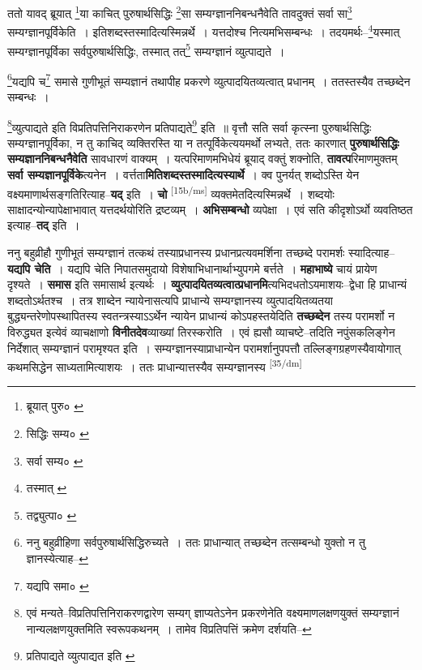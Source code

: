 \documentclass[article,12pt,a4paper]{memoir}
\begin{document}
	ततो यावद् ब्रूयात् \footnote{ब्रूयात् पुरु० \cite{dp-msB} \cite{dp-msC} \cite{dp-edP} \cite{dp-edH} \cite{dp-edE}}या काचित् पुरुषार्थसिद्धिः \footnote{सिद्धिः सम्य० \cite{dp-msA} \cite{dp-msC} \cite{dp-edP} \cite{dp-edH} \cite{dp-edE}}सा सम्यग्ज्ञाननिबन्धनैवेति तावदुक्तं सर्वा सा\footnote{सर्वा सम्य० \cite{dp-msD}} सम्यग्ज्ञानपूर्विकेति । इतिशब्दस्तस्मादित्यस्मिन्नर्थे । यत्तदोश्च नित्यमभिसम्बन्धः । तदयमर्थः--\footnote{तस्मात् \cite{dp-edP}}यस्मात् सम्यग्ज्ञानपूर्विका सर्वपुरुषार्थसिद्धिः, तस्मात् तत्\footnote{तद्व्युत्पा० \cite{dp-msA} \cite{dp-edP} \cite{dp-edH} \cite{dp-edE}} सम्यग्ज्ञानं व्युत्पाद्यते । 
	  
	\footnote{ननु बहुव्रीहिणा सर्वपुरुषार्थसिद्धिरुच्यते । ततः प्राधान्यात् तच्छब्देन तत्सम्बन्धो युक्तो न तु ज्ञानस्येत्याह--\cite{dp-msD-n}}यद्यपि च\footnote{यद्यपि समा० \cite{dp-msC}} समासे गुणीभूतं सम्यज्ञानं तथापीह प्रकरणे व्युत्पादयितव्यत्वात् प्रधानम् । ततस्तस्यैव तच्छब्देन सम्बन्धः । 
	  
	\footnote{एवं मन्यते--विप्रतिपत्तिनिराकरणद्वारेण सम्यग् ज्ञाप्यतेऽनेन प्रकरणेनेति वक्ष्यमाणलक्षणयुक्तं सम्यग्ज्ञानं नान्यलक्षणयुक्तमिति स्वरूपकथनम् । तामेव विप्रतिपत्तिं क्रमेण दर्शयति--\cite{dp-msD-n}}व्युत्पाद्यते इति विप्रतिपत्तिनिराकरणेन प्रतिपाद्यते\footnote{प्रतिपाद्यते व्युत्पाद्यत इति \cite{dp-edE} \cite{dp-edP}} इति ॥ वृत्तौ सति सर्वा कृत्स्ना पुरुषार्थसिद्धिः सम्यग्ज्ञानपूर्विका, न तु काचिद् व्यक्तिरस्ति या न तत्पूर्विकेत्ययमर्थो लभ्यते, ततः कारणात् \textbf{पुरुषार्थसिद्धिः सम्यज्ञाननिबन्धनैवेति} सावधारणं वाक्यम् । यत्परिमाणमभिधेयं ब्रूयाद् वक्तुं शक्नोति, \textbf{तावत्प}रिमाणमुक्तम् \textbf{सर्वा सम्यज्ञानपूर्विके}त्यनेन । वर्त्तता\textbf{मितिशब्दस्तस्मादित्यस्यार्थे} । क्व पुनर्यत् शब्दोऽस्ति येन वक्ष्यमाणार्थसङ्गतिरित्याह--\textbf{यद्} इति । \textbf{चो} \leavevmode\textsuperscript{\rmlatinfont\tiny [15b/ms]} व्यक्तमेतदित्यस्मिन्नर्थे । शब्दयोः साक्षादन्योन्यापेक्षाभावात् यत्तदर्थयोरिति द्रष्टव्यम् । \textbf{अभिसम्बन्धो} व्यपेक्षा । एवं सति कीदृशोऽर्थो व्यवतिष्ठत इत्याह--\textbf{तद्} इति ।
	\pend
      

	  \pstart ननु बहुव्रीहौ गुणीभूतं सम्यग्ज्ञानं तत्कथं तस्याप्रधानस्य प्रधानप्रत्यवमर्शिना तच्छब्दे परामर्शः स्यादित्याह--\textbf{यद्यपि चेति} । यद्यपि चेति निपातसमुदायो विशेषाभिधानार्थाभ्युपगमे बर्त्तते । \textbf{महाभाष्ये} चायं प्रायेण दृश्यते । \textbf{समास} इति समासार्थ इत्यर्थः । \textbf{व्युत्पादयितव्यत्वात्प्रधानमि}त्यभिदधतोऽयमाशयः--द्वेधा हि प्राधान्यं शब्दतोऽर्थतश्च । तत्र शाब्देन न्यायेनासत्यपि प्राधान्ये सम्यग्ज्ञानस्य व्युत्पादयितव्यतया बुद्ध्यन्तरेणोपस्थापितस्य स्वतन्त्रस्याऽऽर्थेन न्यायेन प्राधान्यं कोऽपहस्तयेदिति \textbf{तच्छब्देन} तस्य परामर्शो न विरुद्ध्यत इत्येवं व्याचक्षाणो \textbf{विनीतदेव}व्याख्यां तिरस्करोति । एवं ह्यसौ व्याचष्टे--तदिति नपुंसकलिङ्गेन निर्देशात् सम्यग्ज्ञानं परामृश्यत इति । सम्यग्ज्ञानस्याप्राधान्येन परामर्शानुपपत्तौ तल्लिङ्गग्रहणस्यैवायोगात् कथमसिद्धेन साध्यतामित्याशयः । ततः प्राधान्यात्तस्यैव सम्यग्ज्ञानस्य  \leavevmode\textsuperscript{\rmlatinfont\tiny [35/dm]} 
	  
\end{document}
